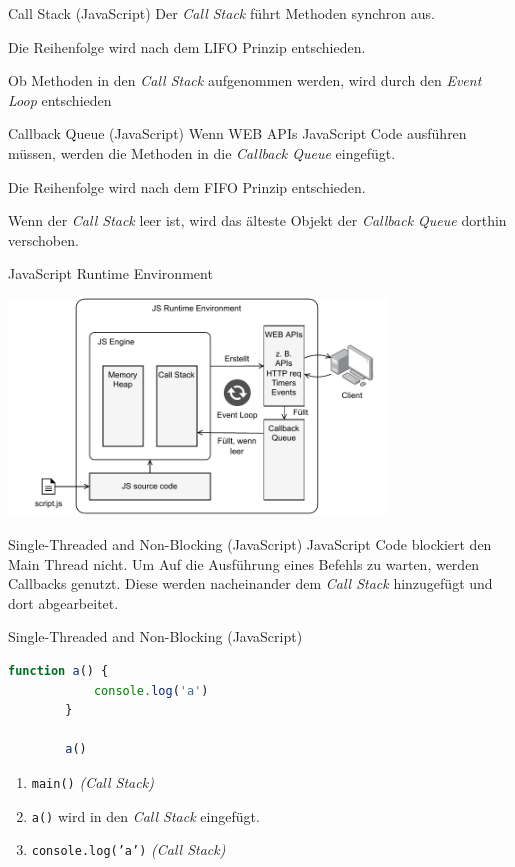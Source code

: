 \begin{defi}{Call Stack (JavaScript)}
    Der \emph{Call Stack} führt Methoden synchron aus.

    Die Reihenfolge wird nach dem LIFO Prinzip entschieden.

    Ob Methoden in den \emph{Call Stack} aufgenommen werden, wird durch den \emph{Event Loop} entschieden
\end{defi}

\begin{defi}{Callback Queue (JavaScript)}
    Wenn WEB APIs JavaScript Code ausführen müssen, werden die Methoden in die \emph{Callback Queue} eingefügt.

    Die Reihenfolge wird nach dem FIFO Prinzip entschieden.

    Wenn der \emph{Call Stack} leer ist, wird das älteste Objekt der \emph{Callback Queue} dorthin verschoben.
\end{defi}

\begin{defi}{JavaScript Runtime Environment}
    \begin{center}
        \includegraphics[width=0.75\textwidth]{includes/figures/defi_js_runtime_environment.pdf}
    \end{center}
\end{defi}

\begin{bonus}{Single-Threaded and Non-Blocking (JavaScript)}
    JavaScript Code blockiert den Main Thread nicht.
    Um Auf die Ausführung eines Befehls zu warten, werden Callbacks genutzt.
    Diese werden nacheinander dem \emph{Call Stack} hinzugefügt und dort abgearbeitet.
\end{bonus}

\begin{example}{Single-Threaded and Non-Blocking (JavaScript)}
    \begin{lstlisting}[language=JavaScript]
        function a() {
            console.log('a')            
        }

        a()
    \end{lstlisting}

    \begin{enumerate}
        \item \texttt{main()} \emph{(Call Stack)}
        \item \texttt{a()} wird in den \emph{Call Stack} eingefügt.
        \item \texttt{console.log('a')} \emph{(Call Stack)}
    \end{enumerate}
\end{example}

